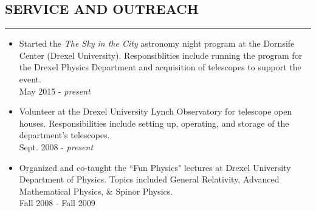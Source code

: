 \documentclass[10pt,a4]{article}
\newcounter{myEnumCounter}
\newcounter{mySaveCounter}
\renewenvironment{enumerate}{%
  \begin{list}{\arabic{myEnumCounter}.}{\usecounter{myEnumCounter}%
  \setcounter{myEnumCounter}{\value{mySaveCounter}}}
  }{%
  \setcounter{mySaveCounter}{\value{myEnumCounter}}\end{list}%
}
\begin{document}
\subsection*{SERVICE AND OUTREACH}
\hrule  height 4pt
\vspace{0.2cm}
\begin{itemize}
	\item Started the \textit{The Sky in the City} astronomy night program
	at the Dornsife Center (Drexel University). Responsiblities include
	running the program for the Drexel Physics Department and acquisition
	of telescopes to support the event. \\
	May 2015 - {\it present}  

	\item Volunteer at the Drexel University Lynch Observatory for
          telescope open houses. Responsibilities include setting up,
          operating, and storage of the department's telescopes. \\
          Sept. 2008 - {\it present}

	\item Organized and co-taught the ``Fun Physics" lectures at 
	Drexel University Department of Physics. Topics included General
	Relativity, Advanced Mathematical Physics, \& Spinor Physics. \\
	Fall 2008 - Fall 2009 
\end{itemize}



    
    
\end{document}
